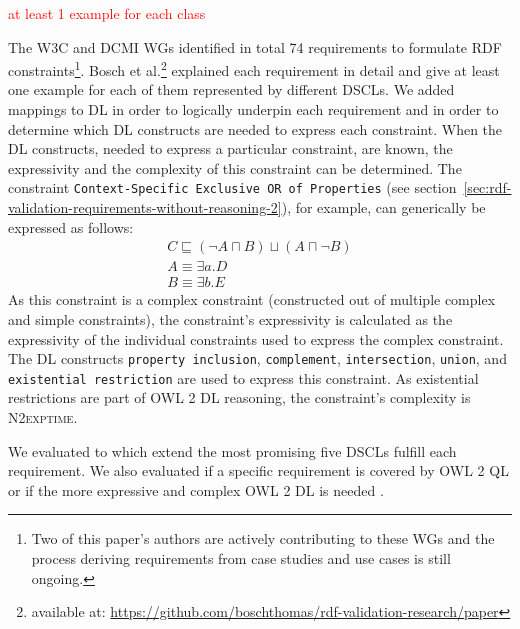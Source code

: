 \documentclass{llncs}
\newcommand{\ms}[1]{\texttt{#1}}
\begin{document}
\textcolor{red}{at least 1 example for each class}


The W3C and DCMI WGs identified in total 74 requirements to formulate RDF constraints\footnote{Two of this paper's authors are actively contributing to these WGs and the process deriving requirements from case studies and use cases is still ongoing.}.
Bosch et al.\footnote{available at: \url{https://github.com/boschthomas/rdf-validation-research/paper}} explained each requirement in detail and give at least one example for each of them represented by different DSCLs.
We added mappings to DL in order to logically underpin each requirement and in order to determine which DL constructs are needed to express each constraint.
When the DL constructs, needed to express a particular constraint, are known, the expressivity and the complexity of this constraint can be determined. 
The constraint \ms{Context-Specific Exclusive OR of Properties} (see section~\ref{sec:rdf-validation-requirements-without-reasoning-2}), for example, can generically be expressed as follows:
\begin{eqnarray*}
C \sqsubseteq (\neg A \sqcap B) \sqcup (A \sqcap \neg B) \\
A \equiv \exists a . D \\
B \equiv \exists b . E  
\end{eqnarray*}
As this constraint is a complex constraint (constructed out of multiple complex and simple constraints), 
the constraint's expressivity is calculated as the expressivity of the individual constraints used to express the complex constraint.
The DL constructs \ms{property inclusion}, \ms{complement}, \ms{intersection}, \ms{union}, and \ms{existential restriction} are used to express this constraint.  
As existential restrictions are part of OWL 2 DL reasoning, the constraint's complexity is \textsc{N2exptime}.
 
We evaluated to which extend the most promising five DSCLs fulfill each requirement.
We also evaluated if a specific requirement is covered by OWL 2 QL or if the more expressive and complex OWL 2 DL is needed \cite{BoschNolleAcarEckert2015}.
\end{document}
